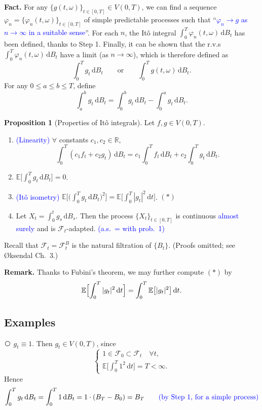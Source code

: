 \documentclass[11pt]{article}
\newcommand{\E}{\mathbb{E}}
\newcommand{\R}{\mathbb{R}}
\newcommand{\F}{\mathcal{F}}
\newcommand{\dd}{\,\mathrm{d}}
\newcommand{\cnum}[1]{\textcircled{\raisebox{-0.6pt}{\scriptsize #1}}} %
\newcommand{\ann}[1]{\textcolor{blue}{#1}}
\theoremstyle{definition}
\newtheorem{proposition}{Proposition}
\begin{document}
\smallskip
\noindent\textbf{Fact.} For any $\{g(t,\omega)\}_{t\in[0,T]}\in V(0,T)$, we can find a sequence
$\varphi_n=\{\varphi_n(t,\omega)\}_{t\in[0,T]}$ of simple predictable processes such that
``\ann{$\varphi_n\to g$ as $n\to\infty$ in a suitable sense}''.
For each $n$, the It\^o integral $\int_0^T\varphi_n(t,\omega)\dd B_t$ has been defined,
thanks to Step 1. Finally, it can be shown that the r.v.s
$\int_0^T\varphi_n(t,\omega)\dd B_t$ have a limit (as $n\to\infty$), which is therefore
defined as
\[
  \int_0^Tg_t\dd B_t \qquad\text{or}\qquad \int_0^Tg(t,\omega)\dd B_t .
\]
For any $0\le a\le b\le T$, define
\[
  \int_a^bg_t\dd B_t=\int_0^bg_t\dd B_t-\int_0^ag_t\dd B_t .
\]

\begin{proposition}[Properties of It\^o integrals]
Let $f,g\in V(0,T)$.
\begin{enumerate}
\item[(i)] \ann{(Linearity)} $\forall$ constants $c_1,c_2\in\R$,
      \[
        \int_0^T(c_1f_t+c_2g_t)\dd B_t
        =c_1\int_0^Tf_t\dd B_t+c_2\int_0^Tg_t\dd B_t .
      \]
\item[(ii)] $\E\bigl[\int_0^Tg_t\dd B_t\bigr]=0$.
\item[(iii)] \ann{(It\^o isometry)}
      $\E\bigl[\bigl(\int_0^Tg_t\dd B_t\bigr)^2\bigr]
       =\E\bigl[\int_0^T|g_t|^2\dd t\bigr]$. \hfill$(\ast)$
\item[(iv)] Let $X_t=\int_0^tg_s\dd B_s$. Then the process $\{X_t\}_{t\in[0,T]}$ is
      continuous \ann{almost surely} and is $\F_t$-adapted.
      \ann{(a.s.\ = with prob.\ 1)}
\end{enumerate}
\end{proposition}

\noindent Recall that $\F_t=\F_t^B$ is the natural filtration of $\{B_t\}$. \;
(Proofs omitted; see \O ksendal Ch.~3.)

\medskip
\noindent\textbf{Remark.} Thanks to Fubini's theorem, we may further compute $(\ast)$ by
\[
  \E\Bigl[\int_0^T|g_t|^2\dd t\Bigr]=\int_0^T\E\bigl[|g_t|^2\bigr]\dd t .
\]

\subsection*{Examples}

\noindent\cnum{1} $g_t\equiv1$. Then $g_t\in V(0,T)$, since
\[
  \begin{cases}
    1\in\F_0\subset\F_t \quad \forall t,\\[2pt]
    \E\bigl[\int_0^T1^2\dd t\bigr]=T<\infty .
  \end{cases}
\]
Hence
\[
  \int_0^Tg_t\dd B_t=\int_0^T1\dd B_t=1\cdot(B_T-B_0)=B_T
  \qquad \ann{\text{(by Step 1, for a simple process)}}
\]
\begin{center}
\end{center}
\end{document}
